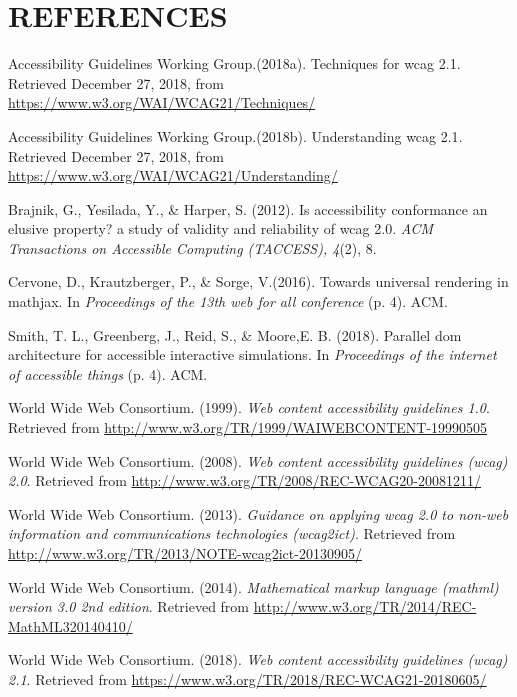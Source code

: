 \documentclass[11.5pt]{sig-alternate} %
\begin{document}
\section*{REFERENCES}\par 

\leftskip 0.25in
\parindent -0.25in 
Accessibility Guidelines Working Group.(2018a). Techniques for wcag 2.1. Retrieved December 27, 2018, from \url{https://www.w3.org/WAI/WCAG21/Techniques/}

Accessibility Guidelines Working Group.(2018b). Understanding wcag 2.1. Retrieved December 27, 2018, from \url{https://www.w3.org/WAI/WCAG21/Understanding/}

Brajnik, G., Yesilada, Y., \& Harper, S. (2012). Is accessibility conformance an elusive property? a study of validity and reliability of wcag 2.0. \textit{ACM Transactions on Accessible Computing (TACCESS), 4}(2), 8.

Cervone, D., Krautzberger, P., \& Sorge, V.(2016). Towards universal rendering in mathjax. In \textit{Proceedings of the 13th web for all conference} (p. 4). ACM.

Smith, T. L., Greenberg, J., Reid, S., \& Moore,E. B. (2018). Parallel dom architecture for accessible interactive simulations. In \textit{Proceedings of the internet of accessible things} (p. 4). ACM.

World Wide Web Consortium. (1999). \textit{Web content accessibility guidelines 1.0}. Retrieved from \url{http://www.w3.org/TR/1999/WAIWEBCONTENT-19990505}

World Wide Web Consortium. (2008). \textit{Web content accessibility guidelines (wcag) 2.0}. Retrieved from \url{http://www.w3.org/TR/2008/REC-WCAG20-20081211/}

World Wide Web Consortium. (2013). \textit{Guidance on applying wcag 2.0 to non-web information and communications technologies (wcag2ict)}. Retrieved from \url{http://www.w3.org/TR/2013/NOTE-wcag2ict-20130905/}

World Wide Web Consortium. (2014). \textit{Mathematical markup language (mathml) version 3.0 2nd edition}. Retrieved from \url{http://www.w3.org/TR/2014/REC-MathML320140410/}

World Wide Web Consortium. (2018). \textit{Web content accessibility guidelines (wcag) 2.1}. Retrieved from \url{https://www.w3.org/TR/2018/REC-WCAG21-20180605/}
\end{document}
